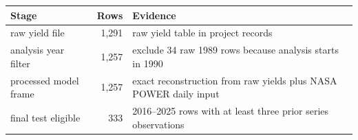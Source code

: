 \begin{tabular}{p{}rp{}}
\toprule
Stage & Rows & Evidence \\
\midrule
raw yield file & 1,291 & raw yield table in project records \\
analysis year filter & 1,257 & exclude 34 raw 1989 rows because analysis starts in 1990 \\
processed model frame & 1,257 & exact reconstruction from raw yields plus NASA POWER daily input \\
final test eligible & 333 & 2016--2025 rows with at least three prior series observations \\
\bottomrule
\end{tabular}
